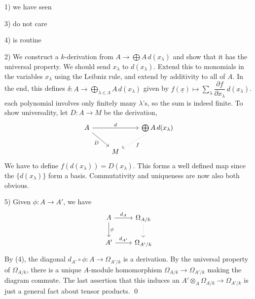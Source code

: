 \pf \hfill

1) we have seen

3) do not care

4) is routine

2) We construct a $k$-derivation from $A \to \bigoplus A \, d(x_\lambda)$ and show that it has the universal property. We should send $x_\lambda$ to $d(x_\lambda)$. Extend this to monomials in the variables $x_\lambda$ using the Leibniz rule, and extend by additivity to all of $A$. In the end, this defines $\delta: A \to \bigoplus_{\lambda \in \Lambda} A \, d(x_\lambda)$ given by $f(\underline{x}) \mapsto \sum_\lambda \dfrac{\partial f}{\partial x_\lambda} \, d(x_\lambda)$. each polynomial involves only finitely many $\lambda$'s, so the sum is indeed finite. To show universality, let $D: A \to M$ be the derivation,
	\[
	\begin{tikzcd}
	A \arrow[swap]{dr}{D} \arrow{rr}{d} &  & \bigoplus A \, d(x_\lambda) \arrow[dotted]{dl}{f} \\
	& M & 
	\end{tikzcd}
	\]
We have to define $f(d(x_\lambda))= D(x_\lambda)$. This forms a well defined map since the $\{d(x_\lambda)\}$ form a basis. Commutativity and uniqueness are now also both obvious. 

5) Given $\phi: A \to A'$, we have 
	\[
	\begin{tikzcd}
	A \arrow{r}{d_A} \arrow{d}{\phi} & \Omega_{A/k} \arrow[dotted]{d} \\
	A' \arrow{r}{d_{A'}} & \Omega_{A'/k}
	\end{tikzcd}
	\]
By (4), the diagonal $d_{A'} \circ \phi: A \to \Omega_{A'/k}$ is a derivation. By the universal property of $\Omega_{A/k}$, there is a unique $A$-module homomorphism $\Omega_{A/k} \to \Omega_{A'/k}$ making the diagram commute. The last assertion that this induces an $A' \otimes_A \Omega_{A/k} \to \Omega_{A'/k}$ is just a general fact about tensor products. \qed \\



































